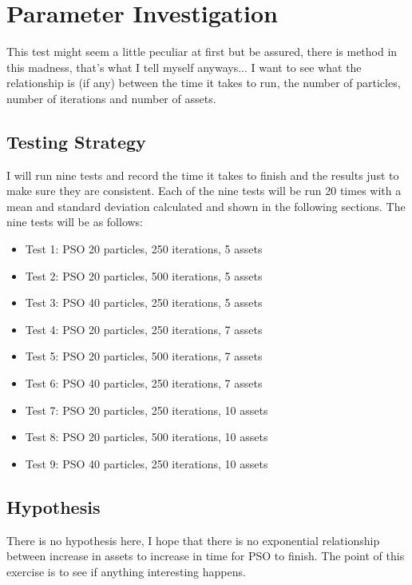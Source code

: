 \documentclass{pdfmx4020}
\begin{document}
  \section{Parameter Investigation} %
  \label{sec:relationships}
  This test might seem a little peculiar at first but be assured, there is method in this madness, that's what I tell myself anyways... I want to see what the relationship is (if any) between the time it takes to run, the number of particles, number of iterations and number of assets.

    \subsection{Testing Strategy} %
    \label{sub:testing_strategy}
      I will run nine tests and record the time it takes to finish and the results just to make sure they are consistent. Each of the nine tests will be run 20 times with a mean and standard deviation calculated and shown in the following sections. The nine tests will be as follows:
        \begin{itemize}
          \item Test 1: PSO 20 particles, 250 iterations, 5 assets
          \item Test 2: PSO 20 particles, 500 iterations, 5 assets
          \item Test 3: PSO 40 particles, 250 iterations, 5 assets
          \item Test 4: PSO 20 particles, 250 iterations, 7 assets
          \item Test 5: PSO 20 particles, 500 iterations, 7 assets
          \item Test 6: PSO 40 particles, 250 iterations, 7 assets
          \item Test 7: PSO 20 particles, 250 iterations, 10 assets
          \item Test 8: PSO 20 particles, 500 iterations, 10 assets
          \item Test 9: PSO 40 particles, 250 iterations, 10 assets
        \end{itemize}

    \subsection{Hypothesis} %
    \label{sub:hypothesis}
    There is no hypothesis here, I hope that there is no exponential relationship between increase in assets to increase in time for PSO to finish. The point of this exercise is to see if anything interesting happens. 
\end{document}
